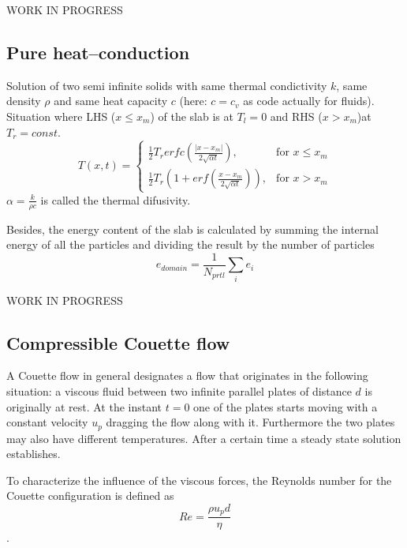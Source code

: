 \documentclass{report}
\begin{document}
WORK IN PROGRESS 

\subsection{Pure heat--conduction}
 
Solution of two semi infinite solids with same thermal condictivity $k$, same density $\rho$ and same heat capacity $c$ (here: $c=c_v$ as code actually for fluids). Situation where LHS ($x \leq x_m$) of the slab is at $T_l=0$ and RHS ($x > x_m$)at $T_r=const.$ \cite{Carslaw1959}
\begin{equation}
 T(x,t)=\begin{cases}
\frac{1}{2} T_r erfc\left(\frac{|x-x_m|}{2\sqrt{\alpha t}}\right),& \text{for  $x\leq x_m$} \\
\frac{1}{2} T_r\left(1+erf\left(\frac{x-x_m}{2\sqrt{\alpha t}}\right)\right),& \text{for  $x> x_m$}
\end{cases}
\end{equation}
$\alpha=\frac{k}{\rho c}$ is called the thermal difusivity. 

Besides, the energy content of the slab is calculated by summing the internal energy of all the particles and dividing the result by the number of particles
\begin{equation}
 \label{eq:energyContent}
e_{\mathit{domain}}=\frac{1}{N_{\mathit{prtl}}}\sum_i e_i
\end{equation}


WORK IN PROGRESS 

\subsection{Compressible Couette flow}
\label{sec:comprCouette_genIntro}
A Couette flow in general designates a flow that originates in the following situation: a viscous fluid between two infinite parallel plates of distance $d$ is originally at rest. At the instant $t=0$ one of the plates starts moving with a constant velocity $u_p$ dragging the flow along with it. Furthermore the two plates may also have different temperatures. After a certain time a steady state solution establishes. 

To characterize the influence of the viscous forces, the Reynolds number for the Couette configuration is defined as
\begin{equation}
\label{eq:Re_comprCouette}
 Re=\frac{\rho u_p d}{\eta}
\end{equation}.
\end{document}
